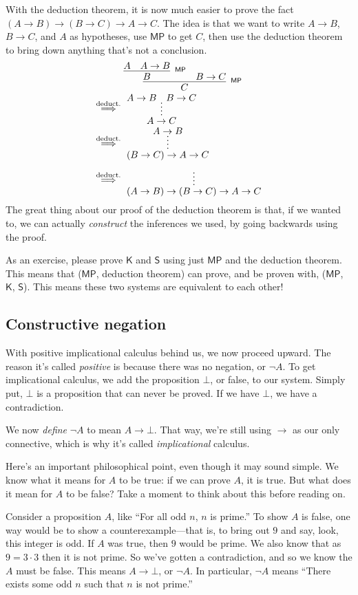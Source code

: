 \documentclass[11pt,paper=letter]{scrartcl}
\renewcommand{\sf}{\mathsf}
\renewcommand{\lnot}{\neg}
\newcommand{\false}{\bot}
\newcommand{\vc}[1]{\vcenter{\hbox{#1}}}
\begin{document}
With the deduction theorem, it is now much easier to prove the fact $(A \to B) \to (B \to C) \to A \to C$. The idea is that we want to write $A \to B$, $B \to C$, and $A$ as hypotheses, use $\sf{MP}$ to get $C$, then use the deduction theorem to bring down anything that's not a conclusion.
\begin{align*}
&\vc{\infer[^\sf{MP}]
{C}
{
\infer[^\sf{MP}]{B}{A & A \to B}
& B \to C
}}\\
\;\overset{\text{deduct.}}{\implies}\;&
\vc{
\infer*
{A \to C}
{A \to B & B \to C}
}\\
\;\overset{\text{deduct.}}{\implies}\;&
\vc{
\infer*
{(B \to C) \to A \to C}
{A \to B}
}\\
\;\overset{\text{deduct.}}{\implies}\;&
\vc{
\infer*
{(A \to B) \to (B \to C) \to A \to C}
{\phantom{A}}
}
\end{align*}
The great thing about our proof of the deduction theorem is that, if we wanted to, we can actually \emph{construct} the inferences we used, by going backwards using the proof.

As an exercise, please prove $\sf{K}$ and $\sf{S}$ using just $\sf{MP}$ and the deduction theorem. This means that ($\sf{MP}$, deduction theorem) can prove, and be proven with, ($\sf{MP}$, $\sf{K}$, $\sf{S}$). This means these two systems are equivalent to each other!

\subsection{Constructive negation}

With positive implicational calculus behind us, we now proceed upward. The reason it's called \emph{positive} is because there was no negation, or $\lnot A$. To get implicational calculus, we add the proposition $\false$, or false, to our system. Simply put, $\false$ is a proposition that can never be proved. If we have $\false$, we have a contradiction.

We now \emph{define} $\lnot A$ to mean $A \to \false$. That way, we're still using $\to$ as our only connective, which is why it's called \emph{implicational} calculus.

Here's an important philosophical point, even though it may sound simple. We know what it means for $A$ to be true: if we can prove $A$, it is true. But what does it mean for $A$ to be false? Take a moment to think about this before reading on.

Consider a proposition $A$, like ``For all odd $n$, $n$ is prime.'' To show $A$ is false, one way would be to show a counterexample---that is, to bring out $9$ and say, look, this integer is odd. If $A$ was true, then $9$ would be prime. We also know that as $9 = 3 \cdot 3$ then it is not prime. So we've gotten a contradiction, and so we know the $A$ must be false. This means $A \to \false$, or $\lnot A$. In particular, $\lnot A$ means ``There exists some odd $n$ such that $n$ is not prime.''
\end{document}
